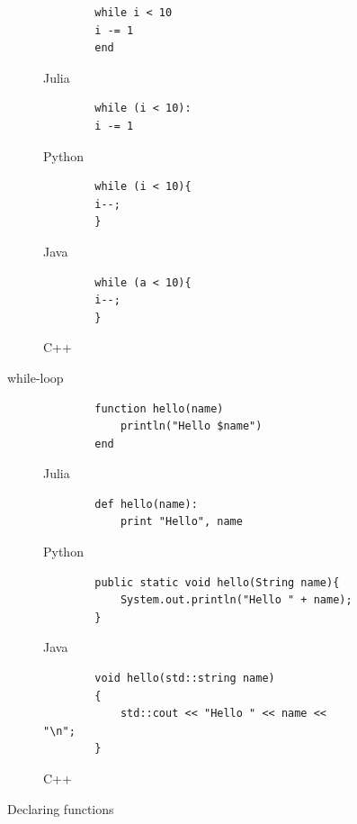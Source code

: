 \documentclass[a4paper, 11pt, titlepage]{article}
\begin{document}
\begin{figure}[H]
	\centering
	\begin{subfigure}[b]{0.7\textwidth}
		\centering
		\begin{lstlisting}
		while i < 10
		i -= 1
		end
		\end{lstlisting}
		\caption{Julia}
	\end{subfigure}
	\begin{subfigure}[b]{0.7\textwidth}
		\centering
		\begin{lstlisting}
		while (i < 10):
		i -= 1
		\end{lstlisting}
		\caption{Python}
	\end{subfigure}	
	\begin{subfigure}[b]{0.7\textwidth}
		\centering
		\begin{lstlisting}
		while (i < 10){
		i--;
		}
		\end{lstlisting}
		\caption{Java}
	\end{subfigure}
	\begin{subfigure}[b]{0.7\textwidth}
		\centering
		\begin{lstlisting}
		while (a < 10){
		i--;
		}
		\end{lstlisting}
		\caption{C++}
	\end{subfigure}
	\caption{while-loop}
	\label{whileloop}
\end{figure}

\begin{figure}[H]
	\centering
	\begin{subfigure}[b]{0.7\textwidth}
		\centering
		\begin{lstlisting}
		function hello(name)
			println("Hello $name")
		end
		\end{lstlisting}
		\caption{Julia}
	\end{subfigure}
	\begin{subfigure}[b]{0.7\textwidth}
		\centering
		\begin{lstlisting}
		def hello(name):
			print "Hello", name
		\end{lstlisting}
		\caption{Python}
	\end{subfigure}	
	\begin{subfigure}[b]{0.7\textwidth}
		\centering
		\begin{lstlisting}
		public static void hello(String name){
			System.out.println("Hello " + name);
		}
		\end{lstlisting}
		\caption{Java}
	\end{subfigure}
	\begin{subfigure}[b]{0.7\textwidth}
		\centering
		\begin{lstlisting}
		void hello(std::string name)
		{
			std::cout << "Hello " << name << "\n";
		}
		\end{lstlisting}
		\caption{C++}
	\end{subfigure}
	\caption{Declaring functions}
	\label{function}
\end{figure}
\end{document}
